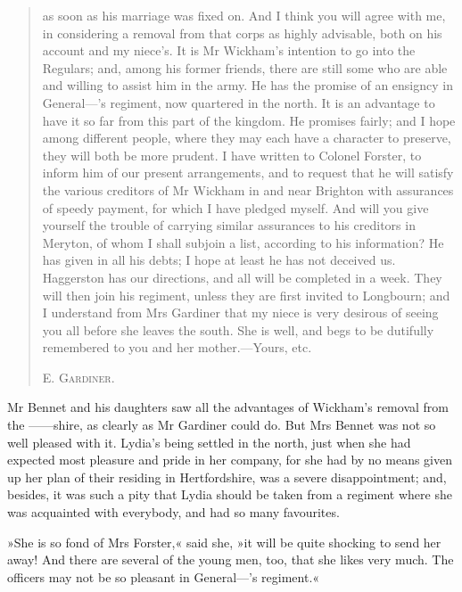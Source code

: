  
 \begin{quotation}
 \noindent as soon as his marriage was fixed on. And I think you will agree with me, in considering a removal from that corps as highly advisable, both on his account and my niece's. It is Mr Wickham's intention to go into the Regulars; and, among his former friends, there are still some who are able and willing to assist him in the army. He has the promise of an ensigncy in General—'s regiment, now quartered in the north. It is an advantage to have it so far from this part of the kingdom. He promises fairly; and I hope among different people, where they may each have a character to preserve, they will both be more prudent. I have written to Colonel Forster, to inform him of our present arrangements, and to request that he will satisfy the various creditors of Mr Wickham in and near Brighton with assurances of speedy payment, for which I have pledged myself. And will you give yourself the trouble of carrying similar assurances to his creditors in Meryton, of whom I shall subjoin a list, according to his information? He has given in all his debts; I hope at least he has not deceived us. Haggerston has our directions, and all will be completed in a week. They will then join his regiment, unless they are first invited to Longbourn; and I understand from Mrs Gardiner that my niece is very desirous of seeing you all before she leaves the south. She is well, and begs to be dutifully remembered to you and her mother.—Yours, etc.

\begin{flushright}
\textsc{E. Gardiner.}
\end{flushright}
\end{quotation}


Mr Bennet and his daughters saw all the advantages of Wickham's removal from the ——shire, as clearly as Mr Gardiner could do. But Mrs Bennet was not so well pleased with it. Lydia's being settled in the north, just when she had expected most pleasure and pride in her company, for she had by no means given up her plan of their residing in Hertfordshire, was a severe disappointment; and, besides, it was such a pity that Lydia should be taken from a regiment where she was acquainted with everybody, and had so many favourites.

»She is so fond of Mrs Forster,« said she, »it will be quite shocking to send her away! And there are several of the young men, too, that she likes very much. The officers may not be so pleasant in General—'s regiment.«

